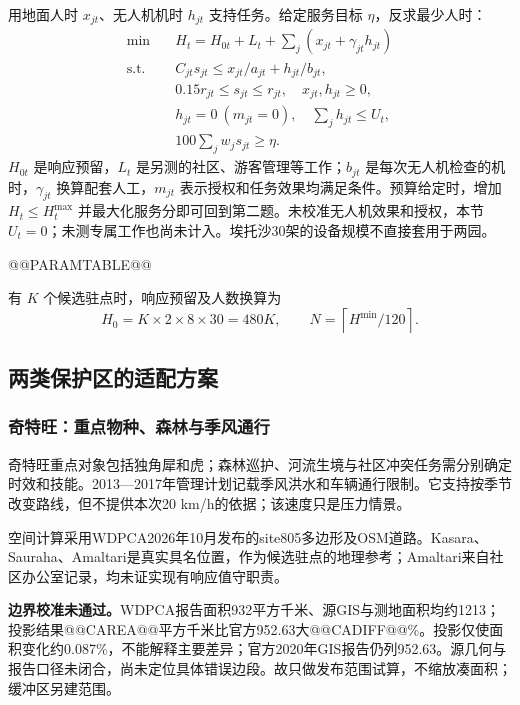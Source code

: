 \documentclass[UTF8,fontset=fandol,12pt,a4paper]{ctexart}
\begin{document}
用地面人时 \(x_{jt}\)、无人机机时 \(h_{jt}\) 支持任务。给定服务目标 \(\eta\)，反求最少人时：
\begin{equation}
\begin{aligned}
\min\quad&H_t=H_{0t}+L_t+\sum_j(x_{jt}+\gamma_{jt}h_{jt})\\
\text{s.t.}\quad&C_{jt}s_{jt}\leq x_{jt}/a_{jt}+h_{jt}/b_{jt},\\
&0.15r_{jt}\leq s_{jt}\leq r_{jt},\quad x_{jt},h_{jt}\geq0,\\
&h_{jt}=0\ (m_{jt}=0),\quad\sum_jh_{jt}\leq U_t,\\
&100\sum_jw_js_{jt}\geq\eta.
\end{aligned}
\label{eq:q6constraints}
\end{equation}
\(H_{0t}\) 是响应预留，\(L_t\) 是另测的社区、游客管理等工作；\(b_{jt}\) 是每次无人机检查的机时，\(\gamma_{jt}\) 换算配套人工，\(m_{jt}\) 表示授权和任务效果均满足条件。预算给定时，增加 \(H_t\leq H_t^{\max}\) 并最大化服务分即可回到第二题。未校准无人机效果和授权，本节 \(U_t=0\)；未测专属工作也尚未计入。埃托沙30架的设备规模不直接套用于两园。

@@PARAMTABLE@@

有 \(K\) 个候选驻点时，响应预留及人数换算为
\begin{equation}
H_0=K\times2\times8\times30=480K,\qquad
N=\left\lceil H^{\min}/120\right\rceil.
\label{eq:q6staff}
\end{equation}

\clearpage
\subsection{两类保护区的适配方案}
\subsubsection{奇特旺：重点物种、森林与季风通行}

奇特旺重点对象包括独角犀和虎；森林巡护、河流生境与社区冲突任务需分别确定时效和技能。2013—2017年管理计划记载季风洪水和车辆通行限制\cite{chitwan,cnpplan}。它支持按季节改变路线，但不提供本次20 km/h的依据；该速度只是压力情景。

空间计算采用WDPCA2026年10月发布的site805多边形及OSM道路\cite{wdpca,osm}。Kasara、Sauraha、Amaltari是真实具名位置，作为候选驻点的地理参考；Amaltari来自社区办公室记录，均未证实现有响应值守职责。

\textbf{边界校准未通过。}WDPCA报告面积932平方千米、源GIS与测地面积均约1213；投影结果@@CAREA@@平方千米比官方952.63大@@CADIFF@@\%\cite{cnparea,gis2020}。投影仅使面积变化约0.087\%，不能解释主要差异；官方2020年GIS报告仍列952.63。源几何与报告口径未闭合，尚未定位具体错误边段。故只做发布范围试算，不缩放凑面积；缓冲区另建范围。
\end{document}
